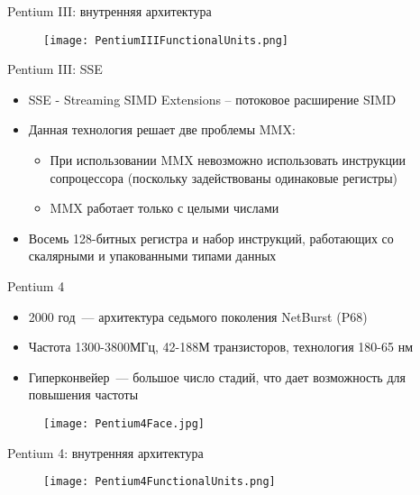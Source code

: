 \documentclass[aspectratio=169,14pt]{beamer}
\begin{document}
\begin{frame}{Pentium III: внутренняя архитектура}
    \begin{figure}[htp]
        \centering
        \texttt{[image: PentiumIIIFunctionalUnits.png]}
    \end{figure}
\end{frame}

\begin{frame}{Pentium III: SSE}
    \begin{itemize}
        \item SSE - Streaming SIMD Extensions – потоковое расширение SIMD
        \item Данная технология решает две проблемы MMX:
        \begin{itemize}
            \item При использовании MMX невозможно использовать
            инструкции сопроцессора (поскольку задействованы
            одинаковые регистры)
            \item MMX работает только с целыми числами
        \end{itemize}
        \item Восемь 128-битных регистра и набор инструкций, работающих со скалярными и упакованными типами данных
    \end{itemize}
\end{frame}

\begin{frame}{Pentium 4}
    \begin{itemize}
        \item 2000 год~--- архитектура седьмого поколения NetBurst (P68)
        \item Частота 1300-3800МГц, 42-188М транзисторов, технология 180-65 нм
        \item Гиперконвейер~--- большое число стадий, что дает
        возможность для повышения частоты
    \end{itemize}
    \begin{figure}[htp]
        \centering
        \texttt{[image: Pentium4Face.jpg]}
    \end{figure}
\end{frame}

\begin{frame}{Pentium 4: внутренняя архитектура}
    \begin{figure}[htp]
        \centering
        \texttt{[image: Pentium4FunctionalUnits.png]}
    \end{figure}
\end{frame}
\end{document}
